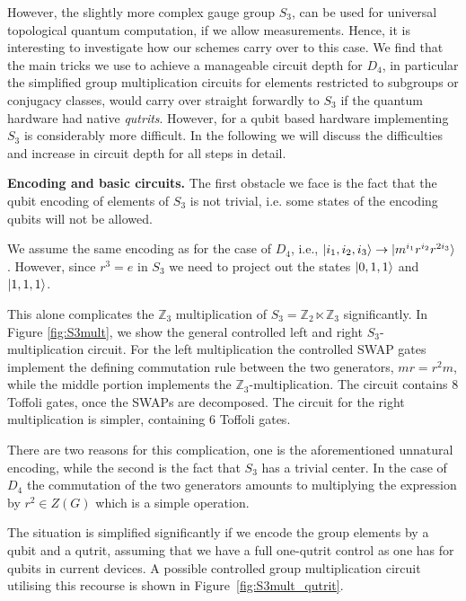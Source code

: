 \documentclass[a4paper,twocolumn,11pt]{quantumarticle}
\begin{document}
However, the slightly more complex gauge group $S_3$, can be used for universal topological quantum computation, if we allow measurements. Hence, it is interesting to investigate how our schemes carry over to this case. We find that the main tricks we use to achieve a manageable circuit depth for $D_4$, in particular the simplified group multiplication circuits for elements restricted to subgroups or conjugacy classes, would carry over straight forwardly to $S_3$ if the quantum hardware had native \emph{qutrits}. However, for a qubit based hardware implementing $S_3$ is considerably more difficult. In the following we will discuss the difficulties and increase in circuit depth for all steps in detail. 

\textbf{Encoding and basic circuits.} The first obstacle we face is the fact that the qubit encoding of elements of $S_3$ is not trivial, i.e. some states of the encoding qubits will not be allowed.

We assume the same encoding as for the case of $D_4$, i.e., $\ket{i_1,i_2,i_3} \to \ket{m^{i_1}r^{i_2}r^{2 i_3}}$. However, since $r^3 = e$ in $S_3$ we need to project out the states $\ket{0,1,1}$ and $\ket{1,1,1}$.

This alone complicates the $\mathbb{Z}_3$ multiplication of $S_3 = \mathbb{Z}_2 \ltimes \mathbb{Z}_3$ significantly. In Figure \ref{fig:S3mult}, we show the general controlled left and right $S_3$-multiplication circuit. For the left multiplication the controlled SWAP gates implement the defining commutation rule between the two generators, $mr = r^2m$, while the middle portion implements the $\mathbb{Z}_3$-multiplication. The circuit contains 8 Toffoli gates, once the SWAPs are decomposed. The circuit for the right multiplication is simpler, containing 6 Toffoli gates.

There are two reasons for this complication, one is the aforementioned unnatural encoding, while the second is the fact that $S_3$ has a trivial center. In the case of $D_4$ the commutation of the two generators amounts to multiplying the expression by $r^2 \in Z(G)$ which is a simple operation.

The situation is simplified significantly if we encode the group elements by a qubit and a qutrit, assuming that we have a full one-qutrit control as one has for qubits in current devices. A possible controlled group multiplication circuit utilising this recourse is shown in Figure~\ref{fig:S3mult_qutrit}.
 
\end{document}
